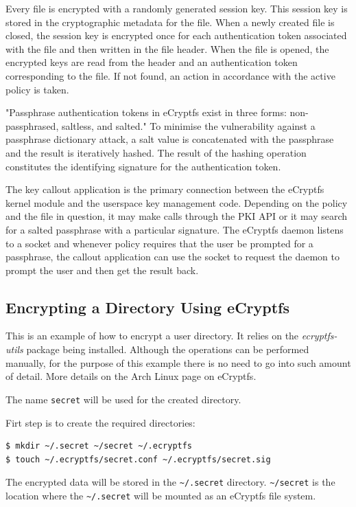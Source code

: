 Every file is encrypted with a randomly generated session key. This session key is stored in the cryptographic metadata for the file. When a newly created file is closed, the session key is encrypted once for each authentication token associated with the file and then written in the file header. When the file is opened, the encrypted keys are read from the header and an authentication token corresponding to the file. If not found, an action in accordance with the active policy is taken.

"Passphrase authentication tokens in eCryptfs exist in three forms: non-passphrased, saltless, and salted\cite{ecryptfs-paper}." To minimise the vulnerability against a passphrase dictionary attack, a salt value is concatenated with the passphrase and the result is iteratively hashed. The result of the hashing operation constitutes the identifying signature for the authentication token.

The key callout application is the primary connection between the eCryptfs kernel module and the userspace key management code. Depending on the policy and the file in question, it may make calls through the PKI API or it may search for a salted passphrase with a particular signature. The eCryptfs daemon listens to a socket and whenever policy requires that the user be prompted for a passphrase, the callout application can use the socket to request the daemon to prompt the user and then get the result back.

\subsection{Encrypting a Directory Using eCryptfs}
\label{sub-sec:encrypt-dir-ecryptfs}

This is an example of how to encrypt a user directory. It relies on the \textit{ecryptfs-utils} package being installed. Although the operations can be performed manually, for the purpose of this example there is no need to go into such amount of detail. More details on the Arch Linux page on eCryptfs\cite{ecryptfs}.

The name \texttt{secret} will be used for the created directory.

Firt step is to create the required directories:
\begin{lstlisting}[numbers=none]
$ mkdir ~/.secret ~/secret ~/.ecryptfs
$ touch ~/.ecryptfs/secret.conf ~/.ecryptfs/secret.sig
\end{lstlisting}

The encrypted data will be stored in the \texttt{\textasciitilde/.secret} directory.
\texttt{\textasciitilde/secret} is the location where the \texttt{\textasciitilde/.secret} will be mounted as an eCryptfs file system.

